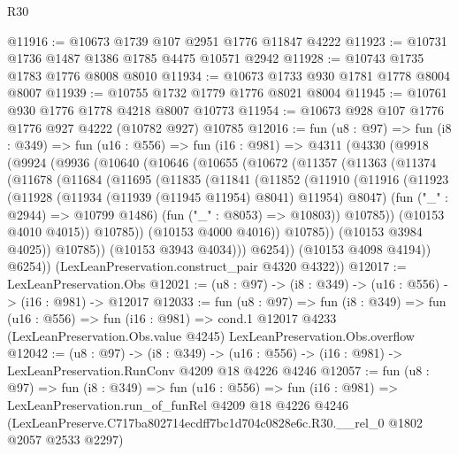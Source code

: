 \begin{lexlean}{R30}
\begin{coremodule}
@11916 := @10673 @1739 @107 @2951 @1776 @11847 @4222
@11923 := @10731 @1736 @1487 @1386 @1785 @4475 @10571 @2942
@11928 := @10743 @1735 @1783 @1776 @8008 @8010
@11934 := @10673 @1733 @930 @1781 @1778 @8004 @8007
@11939 := @10755 @1732 @1779 @1776 @8021 @8004
@11945 := @10761 @930 @1776 @1778 @4218 @8007 @10773
@11954 := @10673 @928 @107 @1776 @1776 @927 @4222 (@10782 @927) @10785
@12016 := fun (u8 : @97) =>
  fun (i8 : @349) =>
  fun (u16 : @556) =>
  fun (i16 : @981) =>
  @4311
    (@4330
      (@9918
        (@9924
          (@9936
            (@10640
              (@10646
                (@10655
                  (@10672
                    (@11357
                      (@11363
                        (@11374
                          (@11678
                            (@11684
                              (@11695
                                (@11835
                                  (@11841
                                    (@11852
                                      (@11910
                                        (@11916
                                          (@11923
                                            (@11928
                                              (@11934 (@11939 (@11945 @11954) @8041) @11954)
                                              @8047)
                                            (fun ("_" : @2944) => @10799 @1486)
                                            (fun ("_" : @8053) => @10803))
                                          @10785))
                                      (@10153 @4010 @4015))
                                    @10785))
                                (@10153 @4000 @4016))
                              @10785))
                          (@10153 @3984 @4025))
                        @10785))
                    (@10153 @3943 @4034)))
                @6254))
            (@10153 @4098 @4194))
          @6254))
      (LexLeanPreservation.construct_pair @4320 @4322))
@12017 := LexLeanPreservation.Obs
@12021 := (u8 : @97) -> (i8 : @349) -> (u16 : @556) -> (i16 : @981) -> @12017
@12033 := fun (u8 : @97) =>
  fun (i8 : @349) =>
  fun (u16 : @556) =>
  fun (i16 : @981) =>
  cond.{1} @12017 @4233 (LexLeanPreservation.Obs.value @4245) LexLeanPreservation.Obs.overflow
@12042 := (u8 : @97) ->
  (i8 : @349) -> (u16 : @556) -> (i16 : @981) -> LexLeanPreservation.RunConv @4209 @18 @4226 @4246
@12057 := fun (u8 : @97) =>
  fun (i8 : @349) =>
  fun (u16 : @556) =>
  fun (i16 : @981) =>
  LexLeanPreservation.run_of_funRel
    @4209
    @18
    @4226
    @4246
    (LexLeanPreserve.C717ba802714ecdff7bc1d704c0828e6c.R30.__rel_0 @1802 @2057 @2533 @2297)
\end{coremodule}
\end{lexlean}
